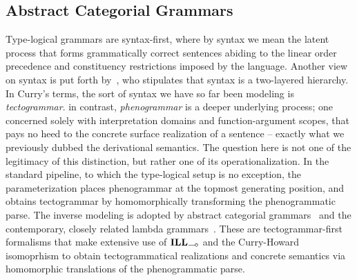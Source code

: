 \subsection{Abstract Categorial Grammars}
\label{subsection:ACG}
Type-logical grammars are syntax-first, where by syntax we mean the latent process that forms grammatically correct sentences abiding to the linear order precedence and constituency restrictions imposed by the language.
Another view on syntax is put forth by~\citet{curry1961some}, who stipulates that syntax is a two-layered hierarchy.
In Curry's terms, the sort of syntax we have so far been modeling is \textit{tectogrammar}.
in contrast, \textit{phenogrammar} is a deeper underlying process; one concerned solely with interpretation domains and function-argument scopes, that pays no heed to the concrete surface realization of a sentence -- exactly what we previously dubbed the derivational semantics.
The question here is not one of the legitimacy of this distinction, but rather one of its operationalization.
In the standard pipeline, to which the type-logical setup is no exception, the parameterization places phenogrammar at the topmost generating position, and obtains tectogrammar by homomorphically transforming the phenogrammatic parse.
The inverse modeling is adopted by abstract categorial grammars~\cite{de2001towards} and the contemporary, closely related lambda grammars~\cite{muskens2001lambda}.
These are tectogrammar-first formalisms that make extensive use of $\ILL_{\li}$ and the Curry-Howard isomoprhism to obtain tectogrammatical realizations and concrete semantics via homomorphic translations of the phenogrammatic parse.
\begin{center}
\end{center}


